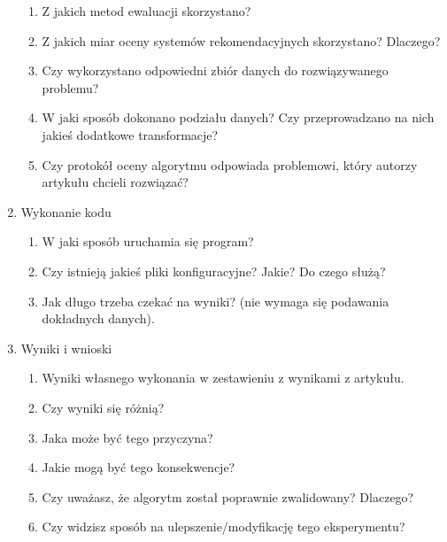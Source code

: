 \documentclass[a4paper]{LTJournalArticle}
\begin{document}
\begin{enumerate}
\begin{enumerate}
			\item Z jakich metod ewaluacji skorzystano?
			\item Z jakich miar oceny systemów rekomendacyjnych skorzystano? Dlaczego?
			\item Czy wykorzystano odpowiedni zbiór danych do rozwiązywanego
			problemu?
			\item W jaki sposób dokonano podziału danych? Czy przeprowadzano na
			nich jakieś dodatkowe transformacje?
			\item Czy protokół oceny algorytmu odpowiada problemowi, który autorzy
			artykułu chcieli rozwiązać?
		\end{enumerate}
		\item Wykonanie kodu
		\begin{enumerate}
			\item W jaki sposób uruchamia się program?
			\item Czy istnieją jakieś pliki konfiguracyjne? Jakie? Do czego służą?
			\item Jak długo trzeba czekać na wyniki? (nie wymaga się podawania
			dokładnych danych).
		\end{enumerate}
		\item Wyniki i wnioski
		\begin{enumerate}
			\item Wyniki własnego wykonania w zestawieniu z wynikami z artykułu.
			\item Czy wyniki się różnią?
			\item Jaka może być tego przyczyna?
			\item Jakie mogą być tego konsekwencje?
			\item Czy uważasz, że algorytm został poprawnie zwalidowany? Dlaczego?
			\item Czy widzisz sposób na ulepszenie/modyfikację tego eksperymentu?
		\end{enumerate}
	\end{enumerate}
\end{document}
